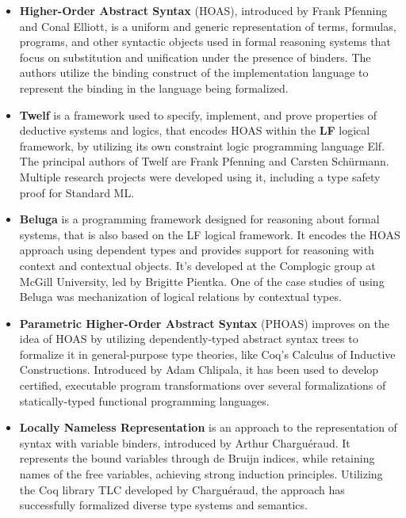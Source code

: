 \documentclass[english, mgr]{iithesis}
\begin{document}
\begin{itemize}
\item \textbf{Higher-Order Abstract Syntax} (HOAS), introduced by Frank Pfenning
and Conal Elliott\cite{hoas}, is a uniform and generic representation of terms, formulas, programs, and other
syntactic objects used in formal reasoning systems that focus on substitution and
unification under the presence of binders. The authors utilize the binding construct of the implementation language to represent the binding in the language being formalized.
\\

\item  \textbf{Twelf}\cite{twelf} is a framework used to specify, implement, and prove properties of deductive systems and logics, that encodes HOAS within the \textbf{LF} logical framework\cite{LF},
by utilizing its own constraint logic programming language Elf.
The principal authors of Twelf are Frank Pfenning and Carsten Schürmann.
Multiple research projects were developed using it, including a type safety proof for Standard ML\cite{twelf-ml}.
\\

\item  \textbf{Beluga}\cite{beluga} is a programming framework designed for reasoning about formal systems,
that is also based on the LF logical framework.
It encodes the HOAS approach using dependent types and provides support for reasoning with context and contextual objects.
It's developed at the Complogic group at McGill University, led by Brigitte Pientka.
One of the case studies of using Beluga was mechanization of logical relations by
contextual types\cite{beluga-relations}.
\\

\item \textbf{Parametric Higher-Order Abstract Syntax} (PHOAS) improves
on the idea of HOAS by utilizing dependently-typed abstract syntax trees to
formalize it in general-purpose type theories, like Coq's Calculus of Inductive Constructions.
Introduced by Adam Chlipala\cite{phoas}, it has been used to develop certified, executable program transformations over several formalizations of statically-typed functional programming languages.
\\

\item \textbf{Locally Nameless Representation} is
an approach to the representation of syntax with variable binders,
introduced by Arthur Charguéraud\cite{locally-nameless}.
It represents the bound variables through de Bruijn indices, while retaining
names of the free variables, achieving strong induction principles.
Utilizing the Coq library TLC developed by Charguéraud, the approach has successfully formalized diverse type systems and semantics.
\\


\end{itemize}
\end{document}
